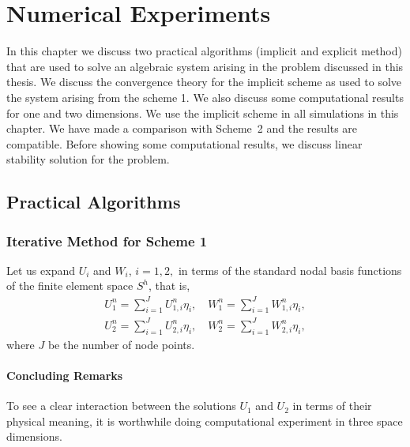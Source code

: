 \chapter{Numerical Experiments}
In this chapter we discuss two practical algorithms (implicit and
explicit method) that are used to solve an
algebraic system arising in the problem discussed in this thesis.   We discuss the convergence theory for the
implicit scheme as used  to solve the system arising from the scheme
1.   We also
discuss  some computational results for  one and
two dimensions. We use the implicit scheme in all
simulations in this chapter. We have made a comparison with Scheme~2
and the results are compatible. Before showing some computational results, we discuss linear stability solution for the problem.
\setcounter{equation}{0}
\section{Practical Algorithms}
\subsection{Iterative  Method for Scheme 1 \label{implicit}}
Let us expand $U_i$ and $W_i$, $i=1,2,$  in terms of the standard
nodal basis functions of the finite element space $S^h$, that
is,
\eqlabon 
\begin{align}
U^n_1=\sum_{i=1}^{J}U_{1,i}^n\eta_i,\quad W^n_1=\sum_{i=1}^{J}W_{1,i}^n\eta_i,\label{5E0001a}\\
U^n_2=\sum_{i=1}^{J}U_{2,i}^n\eta_i,\quad W^n_2=\sum_{i=1}^{J}W_{2,i}^n\eta_i,\label{5E0001b}
\end{align}
where $J$ be the number of node points. 
\eqlaboff

\subsubsection{Concluding Remarks}
To see a clear interaction between the solutions $U_1$ and $U_2$ in
terms of their physical meaning, it is worthwhile doing computational
experiment in three space dimensions.














